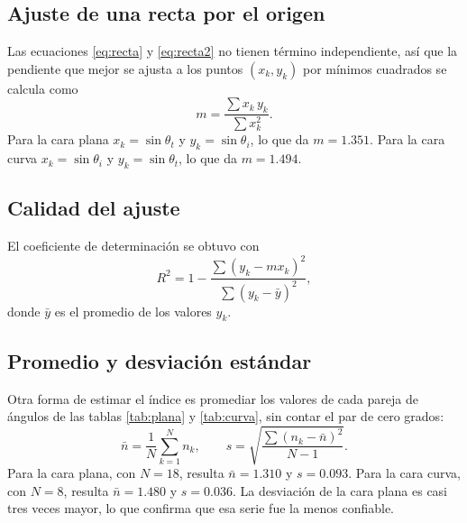 \subsection{Ajuste de una recta por el origen}
Las ecuaciones \eqref{eq:recta} y \eqref{eq:recta2} no tienen término independiente, así que la pendiente que mejor se ajusta a los puntos $(x_k, y_k)$ por mínimos cuadrados se calcula como
\begin{equation}
m = \frac{\sum x_k \, y_k}{\sum x_k^2} .
\label{eq:pendiente}
\end{equation}
Para la cara plana $x_k = \sin\theta_t$ y $y_k = \sin\theta_i$, lo que da $m = 1.351$. Para la cara curva $x_k = \sin\theta_i$ y $y_k = \sin\theta_t$, lo que da $m = 1.494$.

\subsection{Calidad del ajuste}
El coeficiente de determinación se obtuvo con
\begin{equation}
R^2 = 1 - \frac{\sum (y_k - m x_k)^2}{\sum (y_k - \bar{y})^2} ,
\label{eq:r2}
\end{equation}
donde $\bar{y}$ es el promedio de los valores $y_k$.

\subsection{Promedio y desviación estándar}
Otra forma de estimar el índice es promediar los valores de cada pareja de ángulos de las tablas \ref{tab:plana} y \ref{tab:curva}, sin contar el par de cero grados:
\begin{equation}
\bar{n} = \frac{1}{N}\sum_{k=1}^{N} n_k , \qquad
s = \sqrt{\frac{\sum (n_k - \bar{n})^2}{N - 1}} .
\label{eq:promedio}
\end{equation}
Para la cara plana, con $N = 18$, resulta $\bar{n} = 1.310$ y $s = 0.093$. Para la cara curva, con $N = 8$, resulta $\bar{n} = 1.480$ y $s = 0.036$. La desviación de la cara plana es casi tres veces mayor, lo que confirma que esa serie fue la menos confiable.
